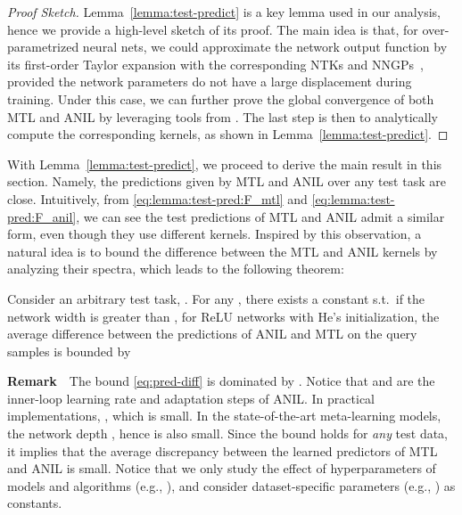 \documentclass{article}
\begin{document}
\begin{proof}[Proof Sketch]
Lemma~\ref{lemma:test-predict} is a key lemma used in our analysis, hence we provide a high-level sketch of its proof. The main idea is that, for over-parametrized neural nets, we could approximate the network output function by its first-order Taylor expansion with the corresponding NTKs and NNGPs~\citep{lee2019wide}, provided the network parameters do not have a large displacement during training. Under this case, we can further prove the global convergence of both MTL and ANIL by leveraging tools from \citet{meta-ntk}. The last step is then to analytically compute the corresponding kernels, as shown in Lemma~\ref{lemma:test-predict}.
\end{proof}









With Lemma~\ref{lemma:test-predict}, we proceed to derive the main result in this section. Namely, the predictions given by MTL and ANIL over any test task are close. Intuitively, from \eqref{eq:lemma:test-pred:F_mtl} and \eqref{eq:lemma:test-pred:F_anil}, we can see the test predictions of MTL and ANIL admit a similar form, even though they use different kernels. Inspired by this observation, a natural idea is to bound the difference between the MTL and ANIL kernels by analyzing their spectra, which leads to the following theorem:

\begin{theorem}\label{thm:closeness}
Consider an arbitrary test task, . For any , there exists a constant  s.t.\ if the network width  is greater than , for ReLU networks with He's initialization, the average difference between the predictions of ANIL and MTL on the query samples  is bounded by 

\end{theorem}


\textbf{Remark}~~The bound \eqref{eq:pred-diff} is dominated by . Notice that  and  are the inner-loop learning rate and adaptation steps of ANIL. In practical implementations, , which is small. In the state-of-the-art meta-learning models, the network depth , hence  is also small. Since the bound holds for \emph{any} test data, it implies that the average discrepancy between the learned predictors of MTL and ANIL is small. Notice that we only study the effect of hyperparameters of models and algorithms (e.g., ), and consider dataset-specific parameters (e.g., ) as constants.
\end{document}

